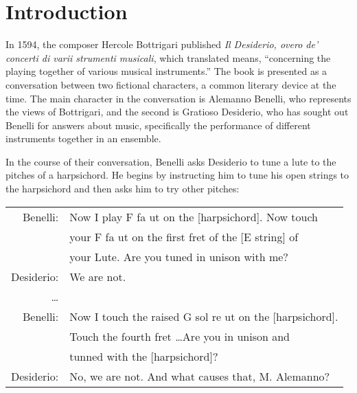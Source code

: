 \chapter*{Introduction}

In 1594, the composer Hercole Bottrigari published 
\textit{Il Desiderio, overo de' concerti di varii strumenti musicali}, which 
translated means, ``concerning the playing together of various musical instruments.''
The book is presented as a conversation between two fictional characters, a common 
literary device at the time.  The main character in the conversation is
Alemanno Benelli, who represents the views of Bottrigari, and the second
is Gratioso Desiderio, who has sought out Benelli for answers about music,
specifically the performance of different instruments together in an ensemble.

In the course of their conversation, Benelli asks Desiderio to tune a lute to
the pitches of a harpsichord.  He begins by instructing him to tune his open
strings to the harpsichord and then asks him to try other pitches:

\begin{blocks}
\begin{center}
\begin{tabular}{r l}
Benelli:   & Now I play F fa ut on the [harpsichord]. Now touch                      \\
           & your F fa ut on the first fret of the [E string] of                     \\
           & your Lute. Are you tuned in unison with me?                             \\
Desiderio: & We are not.                                                             \\
\ldots     &                                                                         \\
Benelli:   & Now I touch the raised G sol re ut on the [harpsichord].                 \\ 
           & Touch the fourth fret \ldots Are you in unison and                      \\
           & tunned with the [harpsichord]?                                          \\
Desiderio: & No, we are not. And what causes that, M. Alemanno? \autocite[18]{HB:1}  \\
\end{tabular}
\end{center}
\end{blocks}

